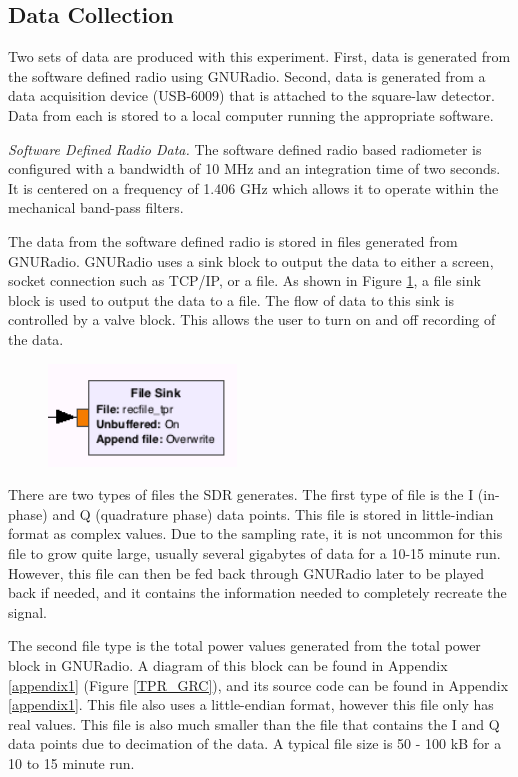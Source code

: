 \subsection{Data Collection}\label{exp1_data}

Two sets of data are produced with this experiment.  First, data is generated from the software defined radio using GNURadio.  Second, data is generated from a data acquisition device (USB-6009) that is attached to the square-law detector.  Data from each is stored to a local computer running the appropriate software.

\emph{Software Defined Radio Data.}  The software defined radio based radiometer is configured with a bandwidth of 10 MHz and an integration time of two seconds.  It is centered on a frequency of 1.406 GHz which allows it to operate within the mechanical band-pass filters.

The data from the software defined radio is stored in files generated from GNURadio.  GNURadio uses a sink block to output the data to either a screen, socket connection such as TCP/IP, or a file.  As shown in Figure \ref{filesink}, a file sink block is used to output the data to a file.  The flow of data to this sink is controlled by a valve block.  This allows the user to turn on and off recording of the data.

{\begin{figure}[h!tb] \centering
\includegraphics[width=5cm]{Images/TPR_Filesink.png}
\label{filesink}
\end{figure}
}

There are two types of files the SDR generates.  The first type of file is the I (in-phase) and Q (quadrature phase) data points.  This file is stored in little-indian format as complex values.  Due to the sampling rate, it is not uncommon for this file to grow quite large, usually several gigabytes of data for a 10-15 minute run.  However, this file can then be fed back through GNURadio later to be played back if needed, and it contains the information needed to completely recreate the signal.

The second file type is the total power values generated from the total power block in GNURadio.  A diagram of this block can be found in Appendix \ref{appendix1} (Figure \ref{TPR_GRC}), and its source code can be found in Appendix \ref{appendix1}.  This file also uses a little-endian format, however this file only has real values.  This file is also much smaller than the file that contains the I and Q data points due to decimation of the data.  A typical file size is 50 - 100 kB for a 10 to 15 minute run.  


